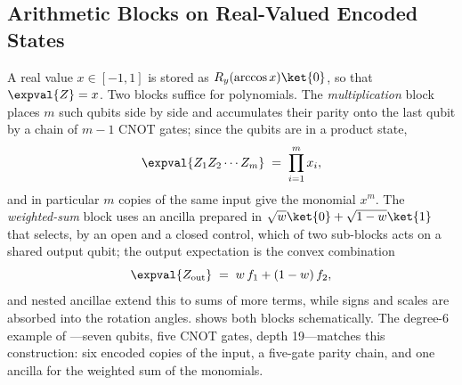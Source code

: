 \subsection{Arithmetic Blocks on Real-Valued Encoded States}\label{sec:qml:nnqa:blocks}

A real value $x \in [-1,1]$ is stored as $R_y(\arccos x)\ket{0}$, so that $\expval{Z} = x$. Two blocks suffice for polynomials. The \emph{multiplication} block places $m$ such qubits side by side and accumulates their parity onto the last qubit by a chain of $m-1$ CNOT gates; since the qubits are in a product state,
\begin{equation}\label{eq:qml:nnqa-mult}
\expval{Z_1 Z_2 \cdots Z_m} \;=\; \prod_{i=1}^{m} x_i,
\end{equation}
and in particular $m$ copies of the same input give the monomial $x^m$. The \emph{weighted-sum} block uses an ancilla prepared in $\sqrt{w}\ket{0} + \sqrt{1-w}\ket{1}$ that selects, by an open and a closed control, which of two sub-blocks acts on a shared output qubit; the output expectation is the convex combination
\begin{equation}\label{eq:qml:nnqa-sum}
\expval{Z_{\mathrm{out}}} \;=\; w\,f_1 + (1-w)\,f_2,
\end{equation}
and nested ancillae extend this to sums of more terms, while signs and scales are absorbed into the rotation angles.  shows both blocks schematically. The degree-6 example of \cite{guo2026nnqa}---seven qubits, five CNOT gates, depth 19---matches this construction: six encoded copies of the input, a five-gate parity chain, and one ancilla for the weighted sum of the monomials.

